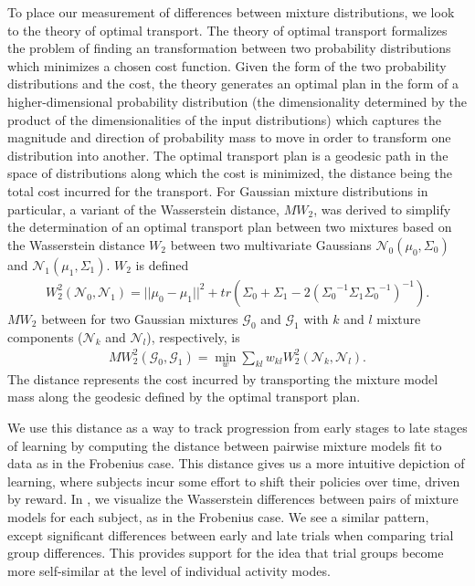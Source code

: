 \documentclass[../main.tex]{subfiles}
\begin{document}
To place our measurement of differences between mixture distributions, we look to the theory of optimal transport. The theory of optimal transport formalizes the problem of finding an transformation between two probability distributions which minimizes a chosen cost function. Given the form of the two probability distributions and the cost, the theory generates an optimal plan in the form of a higher-dimensional probability distribution (the dimensionality determined by the product of the dimensionalities of the input distributions) which captures the magnitude and direction of probability mass to move in order to transform one distribution into another. The optimal transport plan is a geodesic path in the space of distributions along which the cost is minimized, the distance being the total cost incurred for the transport. For Gaussian mixture distributions in particular, a variant of the Wasserstein distance, $MW_2$, was derived to simplify the determination of an optimal transport plan between two mixtures based on the Wasserstein distance $W_2$ between two multivariate Gaussians $\mathcal{N}_0(\mu_0,\Sigma_0)$ and $\mathcal{N}_1(\mu_1,\Sigma_1)$. $W_2$ is defined
%
\begin{align}
  W_2^2(\mathcal{N}_0,\mathcal{N}_1) = ||\mu_0-\mu_1||^2 + tr{(\Sigma_0 + \Sigma_1 - 2( {\Sigma_0}^{-1} \Sigma_1 {\Sigma_0}^{-1} )^{-1})}.
\end{align}
%
$MW_2$ between for two Gaussian mixtures $\mathcal{G_0}$ and $\mathcal{G_1}$ with $k$ and $l$ mixture components ($\mathcal{N}_k$ and $\mathcal{N}_l$), respectively, is
%
\begin{align}
  MW_2^2(\mathcal{G}_0,\mathcal{G}_1) = \min_{w}\sum_{kl}{w_{kl}W_2^2(\mathcal{N}_k,\mathcal{N}_l)}.
\end{align}
%
The distance represents the cost incurred by transporting the mixture model mass along the geodesic defined by the optimal transport plan. 

We use this distance as a way to track progression from early stages to late stages of learning by computing the distance between pairwise mixture models fit to data as in the Frobenius case. This distance gives us a more intuitive depiction of learning, where subjects incur some effort to shift their policies over time, driven by reward. In , we visualize the Wasserstein differences between pairs of mixture models for each subject, as in the Frobenius case. We see a similar pattern, except significant differences between early and late trials when comparing trial group differences. This provides support for the idea that trial groups become more self-similar at the level of individual activity modes. 
\end{document}
